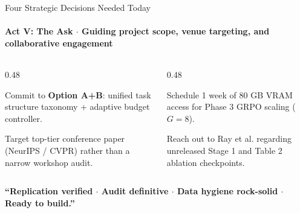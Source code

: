 \documentclass[aspectratio=169, 10pt]{beamer}
\begin{document}
\begin{frame}{Four Strategic Decisions Needed Today}
  \framesubtitle{Act V: The Ask $\cdot$ Guiding project scope, venue targeting, and collaborative engagement}
  
  \begin{columns}[T]
    \begin{column}{0.48\textwidth}
      \begin{tcolorbox}[accentcard, title=\textbf{1. Direction Approval}]
        \small Commit to \textbf{Option A+B}: unified task structure taxonomy + adaptive budget controller.
      \end{tcolorbox}
      \vspace{4pt}
      \begin{tcolorbox}[metriccard, title=\textbf{2. Target Venue Strategy}]
        \small Target top-tier conference paper (NeurIPS / CVPR) rather than a narrow workshop audit.
      \end{tcolorbox}
    \end{column}
    
    \begin{column}{0.48\textwidth}
      \begin{tcolorbox}[metriccard, title=\textbf{3. Compute Scheduling}]
        \small Schedule 1 week of 80 GB VRAM access for Phase 3 GRPO scaling ($G=8$).
      \end{tcolorbox}
      \vspace{4pt}
      \begin{tcolorbox}[alertcard, title=\textbf{4. Author Outreach}]
        \small Reach out to Ray et al. regarding unreleased Stage 1 and Table 2 ablation checkpoints.
      \end{tcolorbox}
    \end{column}
  \end{columns}
  
  \vspace{8pt}
  \begin{center}
    \small \textbf{``Replication verified $\cdot$ Audit definitive $\cdot$ Data hygiene rock-solid $\cdot$ Ready to build.''}
  \end{center}

\end{frame}
\end{document}
